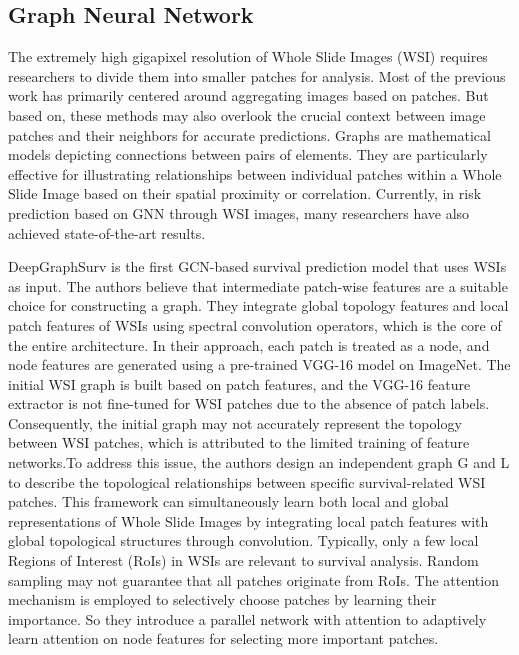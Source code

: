 \documentclass[journal,twoside,web]{ieeecolor}
\begin{document}
\subsection{Graph Neural Network}
The extremely high gigapixel resolution of Whole Slide Images (WSI) requires researchers to divide them into smaller patches for analysis. Most of the previous work has primarily centered around aggregating images based on patches. But based on\cite{levy2020topological}, these methods may also overlook the crucial context between image patches and their neighbors for accurate predictions. Graphs are mathematical models depicting connections between pairs of elements. They are particularly effective for illustrating relationships between individual patches within a Whole Slide Image based on their spatial proximity or correlation. Currently, in risk prediction based on GNN through WSI images, many researchers have also achieved state-of-the-art results.

DeepGraphSurv\cite{li2018graph} is the first GCN-based survival prediction model that uses WSIs as input. The authors believe that intermediate patch-wise features are a suitable choice for constructing a graph. They integrate global topology features and local patch features of WSIs using spectral convolution operators, which is the core of the entire architecture. In their approach, each patch is treated as a node, and node features are generated using a pre-trained VGG-16 model on ImageNet. The initial WSI graph is built based on patch features, and the VGG-16 feature extractor is not fine-tuned for WSI patches due to the absence of patch labels. Consequently, the initial graph may not accurately represent the topology between WSI patches, which is attributed to the limited training of feature networks.To address this issue, the authors design an independent graph G and  L to describe the topological relationships between specific survival-related WSI patches. This framework can simultaneously learn both local and global representations of Whole Slide Images by integrating local patch features with global topological structures through convolution. Typically, only a few local Regions of Interest (RoIs) in WSIs are relevant to survival analysis. Random sampling may not guarantee that all patches originate from RoIs. The attention mechanism is employed to selectively choose patches by learning their importance. So they introduce a parallel network with attention to adaptively learn attention on node features for selecting more important patches.
\end{document}
